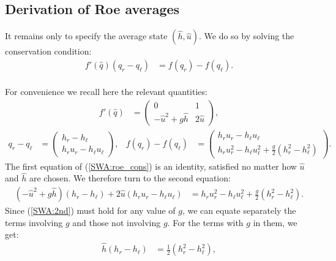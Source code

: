 \documentclass{SIAMbook2016}
\begin{document}
\hypertarget{derivation-of-roe-averages}{%
\subsection{Derivation of Roe
averages}\label{derivation-of-roe-averages}}

It remains only to specify the average state \((\hat{h},\hat{u})\). We
do so by solving the conservation condition:\\
\begin{align} \label{SWA:roe_cons}
f'(\hat{q}) (q_r - q_\ell) & = f(q_r) - f(q_\ell).
\end{align}\\
For convenience we recall here the relevant quantities:\\
\begin{align}
f'(\hat{q}) & = \begin{pmatrix} 0 & 1 \\ -\hat{u}^2 + g \hat{h} & 2 \hat{u} \end{pmatrix},
\end{align} \begin{align*}
q_r - q_\ell & = \begin{pmatrix} h_r - h_\ell \\ h_r u_r - h_\ell u_\ell \end{pmatrix},
& f(q_r) - f(q_\ell) & = \begin{pmatrix} h_r u_r - h_\ell u_\ell \\ h_r u_r^2 - h_\ell u_\ell^2 + \frac{g}{2}(h_r^2-h_\ell^2)\end{pmatrix}.  
\end{align*} The first equation of (\ref{SWA:roe_cons}) is an identity,
satisfied no matter how \(\hat{u}\) and \(\hat{h}\) are chosen. We
therefore turn to the second equation:\\
\begin{align} \label{SWA:2nd}
    (-\hat{u}^2 + g\hat{h})(h_r-h_\ell) + 2\hat{u}(h_r u_r - h_\ell u_\ell) & = h_r u_r^2 - h_\ell u_\ell^2 + \frac{g}{2}(h_r^2-h_\ell^2).
\end{align} Since (\ref{SWA:2nd}) must hold for any value of \(g\), we
can equate separately the terms involving \(g\) and those not involving
\(g\). For the terms with \(g\) in them, we get:\\
\begin{align}  \label{SWA:h_roe1}
\hat{h}(h_r-h_\ell) & = \frac{1}{2} (h_r^2 - h_\ell^2),
\end{align}\\
\end{document}
